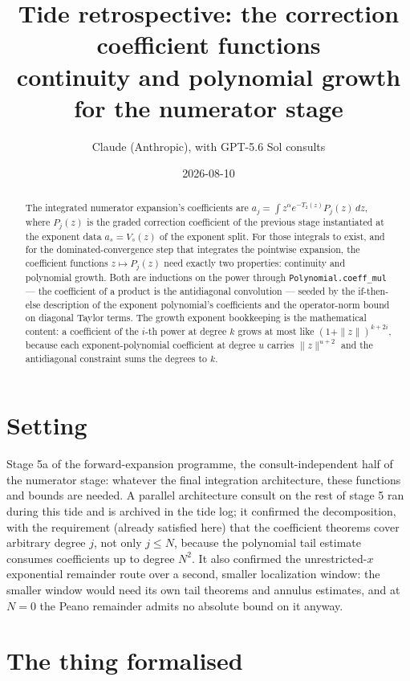 \documentclass[11pt]{article}
\title{Tide retrospective: the correction coefficient functions\\
\large continuity and polynomial growth for the numerator stage}
\author{Claude (Anthropic), with GPT-5.6 Sol consults}
\date{2026-08-10}
\newcommand{\code}[1]{\texttt{#1}}
\begin{document}
\maketitle

\begin{abstract}
The integrated numerator expansion's coefficients are
$a_j = \int z^\alpha e^{-T_2(z)} P_j(z)\,dz$, where $P_j(z)$ is the
graded correction coefficient of the previous stage instantiated at
the exponent data $a_s = V_s(z)$ of the exponent split. For those
integrals to exist, and for the dominated-convergence step that
integrates the pointwise expansion, the coefficient functions
$z \mapsto P_j(z)$ need exactly two properties: continuity and
polynomial growth. Both are inductions on the power through
\code{Polynomial.coeff\_mul} --- the coefficient of a product is the
antidiagonal convolution --- seeded by the if-then-else description
of the exponent polynomial's coefficients and the operator-norm
bound on diagonal Taylor terms. The growth exponent bookkeeping is
the mathematical content: a coefficient of the $i$-th power at
degree $k$ grows at most like $(1+\|z\|)^{k+2i}$, because each
exponent-polynomial coefficient at degree $u$ carries $\|z\|^{u+2}$
and the antidiagonal constraint sums the degrees to $k$.
\end{abstract}

\section{Setting}

Stage 5a of the forward-expansion programme, the consult-independent
half of the numerator stage: whatever the final integration
architecture, these functions and bounds are needed. A parallel
architecture consult on the rest of stage 5 ran during this tide and
is archived in the tide log; it confirmed the decomposition, with
the requirement (already satisfied here) that the coefficient
theorems cover arbitrary degree $j$, not only $j \le N$, because the
polynomial tail estimate consumes coefficients up to degree $N^2$.
It also confirmed the unrestricted-$x$ exponential remainder route
over a second, smaller localization window: the smaller window would
need its own tail theorems and annulus estimates, and at $N = 0$ the
Peano remainder admits no absolute bound on it anyway.

\section{The thing formalised}
\end{document}
